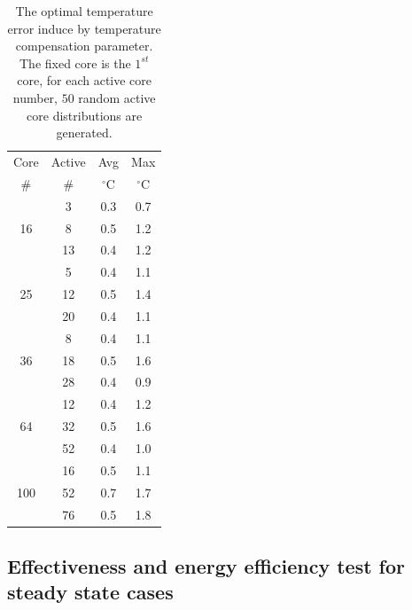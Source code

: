 \begin{table}
  \caption{The optimal temperature error induce by temperature compensation parameter. The fixed core is the $1^{st}$ core, for each active core number, $50$ random active core distributions are generated.}
  \label{tab:opt_tem}
  \centering
  \begin{tabular}{c|c|c|c}
    \hline
    Core & Active     &  Avg  &   Max  \\
    \#       &   \#       &  $^{\circ}$C    & $^{\circ}$C  \\
     \hline
\hline
   \multirow{3}{*}{16} &      3        &   0.3 &   0.7    \\   
             &      8       &    0.5     &  1.2     \\
             &      13     &     0.4    &   1.2   \\
     \hline
  \multirow{3}{*}{25} &      5       &    0.4 & 1.1      \\ 
              &     12      &    0.5     &    1.4     \\
              &     20      &    0.4     &    1.1     \\ 
     \hline
  \multirow{3}{*}{36}  &     8        &    0.4  &    1.1  \\
              &     18      &   0.5      &   1.6     \\
              &     28      &    0.4     &   0.9  \\
     \hline
  \multirow{3}{*}{64}  &     12      &   0.4  &   1.2  \\
              &     32      &    0.5     &     1.6       \\
              &     52      &     0.4   &     1.0    \\
 \hline 
\multirow{3}{*}{100}  & 16 & 	 0.5&	1.1\\
                      & 52 &	 0.7&	1.7\\
                      & 76 &	 0.5&	1.8\\
\hline
\end{tabular}
\end{table}


\subsection{Effectiveness and energy efficiency test for steady state cases}

